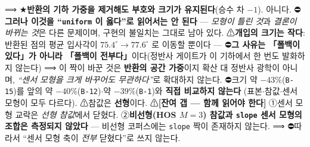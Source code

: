 \documentclass[11pt]{report}
\numberwithin{equation}{chapter}
\numberwithin{figure}{chapter}
\numberwithin{table}{chapter}
\begin{document}
⟹ ★\textbf{반환의 기하 가중을 제거해도 부호와 크기가 유지된다}(승수 차 $-1$).
아니다. ⛔\textbf{그러나 이것을 ``\texttt{uniform} 이 옳다''로 읽어서는 안 된다} ---
\emph{모형이 틀린 것}과 \emph{결론이 바뀌는 것}은 다른 문제이며, 구현의 불일치는
그대로 남아 있다. ⚠\textbf{개입의 크기는 작다}: 반환된 점의 평균 입사각이
$75.4^\circ \to 77.6^\circ$ 로 이동할 뿐이다 --- ⛔\textbf{그 사유는 「폴백이 있다」가
아니라 「폴백이 전부다」}이다(정반사 게이트가 이 기하에서 한 번도 발화하지 않는다)
⟹ 이 짝이 바꾼 것은 \textbf{반환의 공간 가중}이지 확산 대 정반사 광학이 아니며,
\emph{``센서 모형을 크게 바꾸어도 무관하다''}로 확대하지 않는다.
⛔크기 약 $-43\%$(\texttt{B-15})를 앞의 약 $-40\%$(\texttt{B-12})$\cdot$약
$-39\%$(\texttt{B-1})와 \textbf{직접 비교하지 않는다}
(표본$\cdot$참값$\cdot$센서 모형이 모두 다르다). ⚠참값은 \textbf{선형}이다.
⚠\textbf{[잔여 갭 --- 함께 읽어야 한다]} ①센서 모형 교락은 \emph{선형 참값}에서 닫혔다.
②\textbf{비선형(HOS $M{=}3$) 참값과 \texttt{slope} 센서 모형의 조합은 측정되지 않았다}
--- 비선형 코퍼스에는 \texttt{slope} 짝이 존재하지 않는다.
⟹ ⛔따라서 ``센서 모형 축이 \emph{전부} 닫혔다''로 쓰지 않는다.

\end{document}
